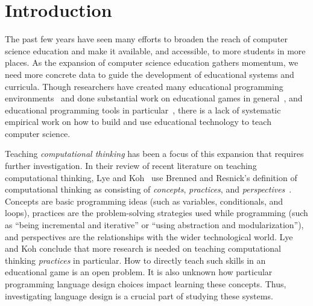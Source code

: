 \documentclass{sig-alternate}
\begin{document}



\section{Introduction}

The past few years have seen many efforts to broaden the reach of computer science education and make it available, and accessible, to more students in more places. As the expansion of computer science education gathers momentum, we need more concrete data to guide the development of educational systems and curricula. Though researchers have created many educational programming environments~\cite{kelleher2005lowering} and done substantial work on educational games in general~\cite{backlund2013educational}, and educational programming tools in particular~\cite{salleh2013analysis}, there is a lack of systematic empirical work on how to build and use educational technology to teach computer science.

Teaching \emph{computational thinking} has been a focus of this expansion that requires further investigation. In their review of recent literature on teaching computational thinking, Lye and Koh~\cite{lye2014review} use Brenned and Resnick's definition of computational thinking as consisting of \emph{concepts}, \emph{practices}, and \emph{perspectives}~\cite{brennan2012new}. Concepts are basic programming ideas (such as variables, conditionals, and loops), practices are the problem-solving strategies used while programming (such as ``being incremental and iterative'' or ``using abstraction and modularization''), and perspectives are the relationships with the wider technological world. Lye and Koh conclude that more research is needed on teaching computational thinking \emph{practices} in particular. How to directly teach such skills in an educational game is an open problem. It is also unknown how particular programming language design choices impact learning these concepts. Thus, investigating language design is a crucial part of studying these systems.
\end{document}
